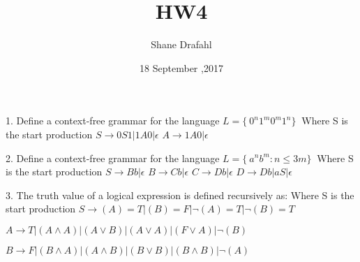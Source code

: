 \documentclass[11pt]{article}
\title{HW4}
\author{Shane Drafahl}
\date{18 September ,2017}
\begin{document}
    \maketitle

    1. Define a context-free grammar for the language $ L = \{\ 0^{n} 1^{m} 0^{m} 1^{n} \}\ $
    Where S is the start production
    $ S \rightarrow 0S1 | 1A0 | \epsilon $
    $ A \rightarrow 1A0 | \epsilon $

    2. Define a context-free grammar for the language $ L = \{\ a^{n}b^{m} : n \leq 3m \}\ $
    Where S is the start production
    $ S \rightarrow Bb | \epsilon $
    $ B \rightarrow Cb | \epsilon $
    $ C \rightarrow Db | \epsilon $
    $ D \rightarrow Db | aS | \epsilon $

    3. The truth value of a logical expression is defined recursively as:
    Where S is the start production
    $ S \rightarrow (A) = T | (B) = F | \neg(A) = T | \neg(B) = T $
    
    $ A \rightarrow T | (A \wedge A ) | (A \vee B) | (A \vee A) | (F \vee A) | \neg(B) $
    
    $ B \rightarrow F | (B \wedge A ) | (A \wedge B) | (B \vee B) | (B \wedge B) | \neg(A) $


    
\end{document}
